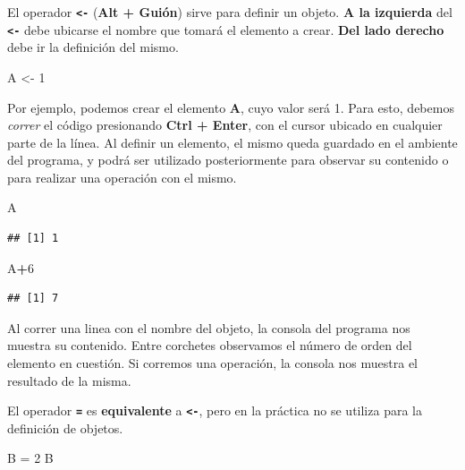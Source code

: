 \documentclass[]{book}
\newenvironment{Shaded}{\begin{snugshade}}{\end{snugshade}}
\newcommand{\DecValTok}[1]{\textcolor[rgb]{0.00,0.00,0.81}{#1}}
\newcommand{\NormalTok}[1]{#1}
\newcommand{\OperatorTok}[1]{\textcolor[rgb]{0.81,0.36,0.00}{\textbf{#1}}}
\newcommand{\StringTok}[1]{\textcolor[rgb]{0.31,0.60,0.02}{#1}}
\begin{document}
El operador \textbf{\texttt{\textless{}-}} (\textbf{Alt + Guión}) sirve para definir un objeto. \textbf{A la izquierda} del \textbf{\texttt{\textless{}-}} debe ubicarse el nombre que tomará el elemento a crear. \textbf{Del lado derecho} debe ir la definición del mismo.

\begin{Shaded}
\begin{Highlighting}[]
\NormalTok{A <-}\StringTok{ }\DecValTok{1}
\end{Highlighting}
\end{Shaded}

Por ejemplo, podemos crear el elemento \textbf{A}, cuyo valor será 1. Para esto, debemos \emph{correr} el código presionando \textbf{Ctrl + Enter}, con el cursor ubicado en cualquier parte de la línea. Al definir un elemento, el mismo queda guardado en el ambiente del programa, y podrá ser utilizado posteriormente para observar su contenido o para realizar una operación con el mismo.

\begin{Shaded}
\begin{Highlighting}[]
\NormalTok{A }
\end{Highlighting}
\end{Shaded}

\begin{verbatim}
## [1] 1
\end{verbatim}

\begin{Shaded}
\begin{Highlighting}[]
\NormalTok{A}\OperatorTok{+}\DecValTok{6}
\end{Highlighting}
\end{Shaded}

\begin{verbatim}
## [1] 7
\end{verbatim}

Al correr una linea con el nombre del objeto, la consola del programa nos muestra su contenido. Entre corchetes observamos el número de orden del elemento en cuestión. Si corremos una operación, la consola nos muestra el resultado de la misma.

El operador \textbf{\texttt{=}} es \textbf{equivalente} a \textbf{\texttt{\textless{}-}}, pero en la práctica no se utiliza para la definición de objetos.

\begin{Shaded}
\begin{Highlighting}[]
\NormalTok{B =}\StringTok{ }\DecValTok{2}
\NormalTok{B}
\end{Highlighting}
\end{Shaded}
\end{document}
